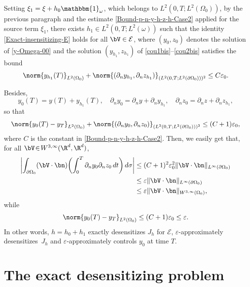 Setting $\xi_1 = \xi + h_0 \mathbbm{1}_\omega$, which belongs to $L^2(0,T; L^2(\Omega_0))$, by the previous paragraph and the estimate \eqref{Bound-p-n-y-h-z-h-Case2} applied for the source term $\xi_1$, there exists $h_1 \in L^2(0,T;L^2(\omega))$ such that the identity \eqref{Exact-insensitizing-E} holds for all $\bV \in \mathcal{E}$, where $(y_0,z_0)$ denotes the solution of \eqref{y-Omega-00} and the solution $(y_{h_1}, z_{h_1})$ of \eqref{cou1bis}--\eqref{cou2bis} satisfies the bound
\[
\norm{y_{h_1}(T)}_{L^2(\Omega_0)}
+
\norm{(\partial_n y_{h_1}, \partial_n z_{h_1})}_{(L^2(0,T; L^2(\partial \Omega_0)))^2}
\leq
C \varepsilon_0.
\]

Besides,\vspace*{-3pt}
\[
y_0(T) = y(T) + y_{h_1}(T),
\quad
\partial_n y_0 = \partial_n y + \partial_n y_{h_1},
\quad
\partial_n z_0 = \partial_n z + \partial_n z_{h_1},
\]
so that\vspace*{-3pt}
\[
\norm{y_0(T) - y_T}_{L^2(\Omega_0)} + \norm{(\partial_n y_0, \partial_n z_0)}_{(L^2(0,T; L^2(\partial \Omega_0)))^2}
\leq
(C+1) \varepsilon_0,
\]
where $C$ is the constant in \eqref{Bound-p-n-y-h-z-h-Case2}. Then, we easily get that, for all $\bV\!\in\! W^{3, \infty}(\R^d, \R^d)$,
\begin{align*}
\biggl| \int_{\partial\Omega_{0}}(\bV\cdot \bn)
\biggl(\int_{0}^{T}\partial_{n}y_{0}\partial_{n} z_{0}\, dt \biggr)\,
d\sigma
\biggr|
&\leq (C+1)^2 \varepsilon_0^2 \| \bV\cdot \bn\|_{L^\infty(\partial \Omega_0)}
\\
& \leq \varepsilon \| \bV\cdot \bn\|_{L^\infty(\partial \Omega_0)}\\
& \leq \varepsilon \| \bV\cdot \bn\|_{W^{3,\infty}(\Omega_0)},
\end{align*}
while\vspace*{-3pt}
\[
\norm{y_0(T) - y_T}_{L^2(\Omega_0)} \leq (C+1) \varepsilon_0 \leq \varepsilon.
\]
In other words, $h = h_0 + h_1$ exactly desensitizes $J_h$ for $\mathcal{E}$, $\varepsilon$-approximately desensitizes~$J_h$ and $\varepsilon$-approximately controls $y_0$ at time $T$.

\section{The exact desensitizing problem}\label{Sec-Exact-insensitizing}


